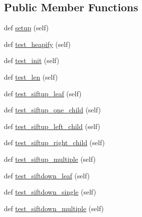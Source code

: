 \subsection*{Public Member Functions}
\begin{DoxyCompactItemize}
\item 
def \hyperlink{classnetworkx_1_1utils_1_1tests_1_1test__mapped__queue_1_1TestMappedQueue_a844d5063c1a6078d59e3dde7d2eb2bcd}{setup} (self)
\item 
def \hyperlink{classnetworkx_1_1utils_1_1tests_1_1test__mapped__queue_1_1TestMappedQueue_a2aa09b4424be3353ce2930e7a8fbf69f}{test\+\_\+heapify} (self)
\item 
def \hyperlink{classnetworkx_1_1utils_1_1tests_1_1test__mapped__queue_1_1TestMappedQueue_a9622698eb915eb17f3768b8921be822c}{test\+\_\+init} (self)
\item 
def \hyperlink{classnetworkx_1_1utils_1_1tests_1_1test__mapped__queue_1_1TestMappedQueue_a6bbb5c30f3bfb851b0e706533af35039}{test\+\_\+len} (self)
\item 
def \hyperlink{classnetworkx_1_1utils_1_1tests_1_1test__mapped__queue_1_1TestMappedQueue_abf1ac1fc14667dbd7c50c1145d4fc3c1}{test\+\_\+siftup\+\_\+leaf} (self)
\item 
def \hyperlink{classnetworkx_1_1utils_1_1tests_1_1test__mapped__queue_1_1TestMappedQueue_ae7b11a05e553b9ab17c6bab1d836fb37}{test\+\_\+siftup\+\_\+one\+\_\+child} (self)
\item 
def \hyperlink{classnetworkx_1_1utils_1_1tests_1_1test__mapped__queue_1_1TestMappedQueue_aee6d5235b4445c6b64477a0b6132dc33}{test\+\_\+siftup\+\_\+left\+\_\+child} (self)
\item 
def \hyperlink{classnetworkx_1_1utils_1_1tests_1_1test__mapped__queue_1_1TestMappedQueue_a59bb4281fb0f764700845904b40168f7}{test\+\_\+siftup\+\_\+right\+\_\+child} (self)
\item 
def \hyperlink{classnetworkx_1_1utils_1_1tests_1_1test__mapped__queue_1_1TestMappedQueue_a1bc74d31ef59ec4bce3c946757ce51e2}{test\+\_\+siftup\+\_\+multiple} (self)
\item 
def \hyperlink{classnetworkx_1_1utils_1_1tests_1_1test__mapped__queue_1_1TestMappedQueue_a37452f1aeb93274faeb013887662f7ae}{test\+\_\+siftdown\+\_\+leaf} (self)
\item 
def \hyperlink{classnetworkx_1_1utils_1_1tests_1_1test__mapped__queue_1_1TestMappedQueue_a49609982c8fb74954d42dd4e797751a2}{test\+\_\+siftdown\+\_\+single} (self)
\item 
def \hyperlink{classnetworkx_1_1utils_1_1tests_1_1test__mapped__queue_1_1TestMappedQueue_a9eea08a7f906c289bc6a72ebb1976fc4}{test\+\_\+siftdown\+\_\+multiple} (self)

\end{DoxyCompactItemize}
